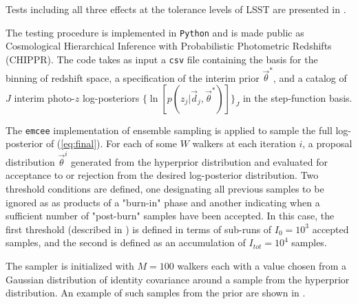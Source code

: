 Tests including all three effects at the tolerance levels of LSST are presented in .

The testing procedure is implemented in \texttt{Python} and is made public as Cosmological Hierarchical Inference with Probabilistic Photometric Redshifts (CHIPPR).  
The code takes as input a \texttt{csv} file containing the basis for the binning of redshift space, a specification of the interim prior $\vec{\theta}^{*}$, and a catalog of $J$ interim photo-$z$ log-posteriors $\{\ln[p(z_{j}|\vec{d}_{j},\vec{\theta}^{*})]\}_{J}$ in the step-function basis.

The \texttt{emcee} \citep{Foreman-Mackey2013} implementation of ensemble sampling is applied to sample the full log-posterior of (\ref{eq:final}).   
For each of some $W$ walkers at each iteration $i$, a proposal distribution $\vec{\theta}^{i}$ generated from the hyperprior distribution and evaluated for acceptance to or rejection from the desired log-posterior distribution.  
Two threshold conditions are defined, one designating all previous samples to be ignored as as products of a "burn-in" phase and another indicating when a sufficient number of "post-burn" samples have been accepted.  
In this case, the first threshold (described in ) is defined in terms of sub-runs of $I_{0}=10^{3}$ accepted samples, and the second is defined as an accumulation of $I_{tot}=10^{4}$ samples.

The sampler is initialized with $M=100$ walkers each with a value chosen from a Gaussian distribution of identity covariance around a sample from the hyperprior distribution.  
An example of such samples from the prior are shown in .

